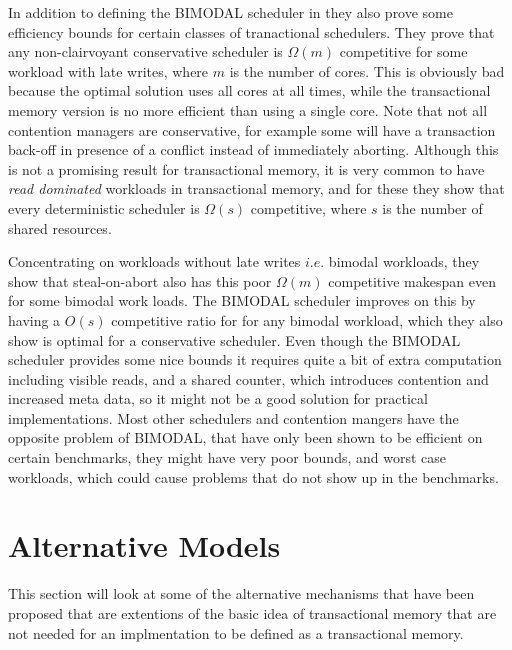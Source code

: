 In addition to defining the BIMODAL scheduler in \cite{1696831} they also prove some efficiency bounds for certain classes of tranactional schedulers.
They prove that any non-clairvoyant conservative scheduler is $\Omega(m)$ competitive for some workload with late writes, where $m$ is the number of cores.
This is obviously bad because the optimal solution uses all cores at all times, while the transactional memory version is no more efficient than using a single core.
Note that not all contention managers are conservative, for example some will have a transaction back-off in presence of a conflict instead of immediately aborting.
Although this is not a promising result for transactional memory, it is very common to have \emph{read dominated} workloads in transactional memory, and for these they show that every deterministic scheduler is $\Omega(s)$ competitive, where $s$ is the number of shared resources.

Concentrating on workloads without late writes $i.e.$ bimodal workloads, they show that steal-on-abort also has this poor $\Omega(m)$ competitive makespan even for some bimodal work loads. 
The BIMODAL scheduler improves on this by having a $O(s)$ competitive ratio for for any bimodal workload, which they also show is optimal for a conservative scheduler.
Even though the BIMODAL scheduler provides some nice bounds it requires quite a bit of extra computation including visible reads, and a shared counter, which introduces contention and increased meta data, so it might not be a good solution for practical implementations.
Most other schedulers and contention mangers have the opposite problem of BIMODAL,  that have only been shown to be efficient on certain benchmarks, they might have very poor bounds, and worst case workloads, which could cause problems that do not show up in the benchmarks.


\section{Alternative Models}
This section will look at some of the alternative mechanisms that have been proposed that are extentions of the basic idea of transactional memory that are not needed for an implmentation to be defined as a transactional memory.

